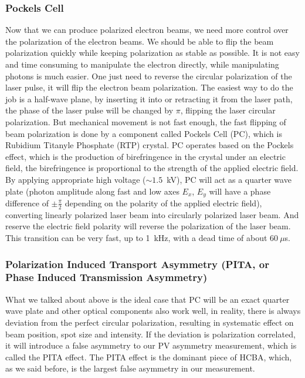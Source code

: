 \subsubsection{Pockels Cell}
Now that we can produce polarized electron beams, we need more control over the
polarization of the electron beams. We should be able to flip the beam polarization
quickly while keeping polarization as stable as possible. It is not easy and time
consuming to manipulate the electron directly, while manipulating photons is much 
easier. One just need to reverse the circular polarization of the laser pulse,
it will flip the electron beam polarization. The easiest way to do the job is
a half-wave plane, by inserting it into or retracting it from the laser path,
the phase of the laser pulse will be changed by $\pi$, flipping the laser
circular polarization. But mechanical movement is not fast enough, the fast 
flipping of beam polarization is done by a component called Pockels Cell (PC),
which is Rubidium Titanyle Phosphate (RTP) crystal. PC operates based on the 
Pockels effect, which is the production of birefringence in the crystal under
an electric field, the birefringence is proportional to the strength of the
applied electric field. By applying appropriate high voltage ($\sim 1.5$~kV),
PC will act as a quarter wave plate (photon amplitude along fast and low axes
$E_x$, $E_y$ will have a phase difference of $\pm \frac{\pi}{2}$ depending on
the polarity of the applied electric field), converting linearly polarized laser beam
into circularly polarized laser beam. And reserve the electric field polarity
will reverse the polarization of the laser beam. This transition can be very
fast, up to 1~kHz, with a dead time of about $60\ \mu$s.

\subsubsection{Polarization Induced Transport Asymmetry (PITA, or Phase Induced Transmission Asymmetry) \cite{Cary2019}}
What we talked about above is the ideal case that PC will be an exact quarter wave
plate and other optical components also work well, in reality, there is always 
deviation from the perfect circular polarization,
resulting in systematic effect on beam position, spot size and intensity. If the deviation 
is polarization correlated, it will introduce a false asymmetry to our PV asymmetry 
measurement, which is called the PITA effect. The PITA effect is the dominant
piece of HCBA, which, as we said before, is the largest false asymmetry in
our measurement.

